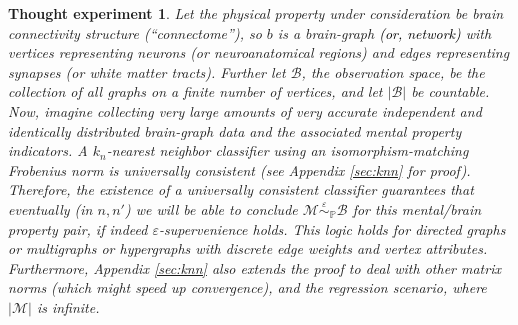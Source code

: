 \documentclass{article}
\newcommand{\mB}{\mathcal{B}}
\newcommand{\mM}{\mathcal{M}}
\newcommand{\PP}{\mathbb{P}}           %
\newcommand{\MeB}{\mM \overset{\varepsilon}{{\sim}}_{\PP} \mB}
\providecommand{\tr}[1]{\textcolor{black}{#1}}
\newtheorem{thex}{Thought experiment}
\begin{document}
\begin{thex}
Let the physical property under consideration be brain connectivity structure (``connectome''), so $b$ is a brain-graph \tr{(or, network)} with vertices representing neurons (or neuroanatomical regions) and edges representing synapses (or white matter tracts). Further let $\mB$, the observation space, be the collection of all graphs on a finite number of vertices, and let $|\mB|$ be countable. Now, imagine collecting very large amounts of very accurate independent and identically distributed brain-graph data and the associated mental property indicators. A $k_n$-nearest neighbor classifier using an isomorphism-matching Frobenius norm is universally consistent (see Appendix \ref{sec:knn} for proof). Therefore, %
the existence of a universally consistent classifier guarantees that eventually (in $n,n'$) we will be able to conclude $\MeB$ for this mental/brain property pair, if indeed $\varepsilon$-supervenience holds. This logic holds for directed graphs or multigraphs or hypergraphs with discrete edge weights and vertex attributes. Furthermore, Appendix \ref{sec:knn} also extends the proof to deal with other matrix norms (which might speed up convergence), and the regression scenario, where $|\mM|$ is infinite.  
\end{thex}
\end{document}
